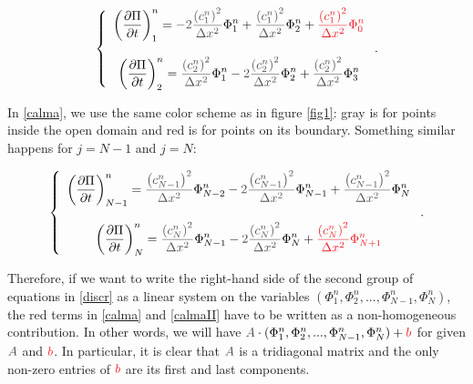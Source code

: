 \documentclass{article}
\begin{document}
\begin{equation}\label{calma}
\left\{\begin{array}{c}
\displaystyle\left(\frac{\partial \Pi}{\partial t}\right)^n_1=\textcolor{grayII}{-2\frac{\left(c^n_1\right)^2}{\Delta x^2}}\Phi^n_1+\textcolor{grayII}{\frac{\left(c^n_1\right)^2}{\Delta x^2}}\Phi^n_2+\textcolor{Red}{\frac{\left(c^n_1\right)^2}{\Delta x^2}\Phi^n_{0}}\\
\text{ }\\
\displaystyle\left(\frac{\partial \Pi}{\partial t}\right)^n_2=\textcolor{grayII}{\frac{\left(c^n_2\right)^2}{\Delta x^2}}\Phi^n_1-\textcolor{grayII}{2\frac{\left(c^n_2\right)^2}{\Delta x^2}}\Phi^n_2+\textcolor{grayII}{\frac{\left(c^n_2\right)^2}{\Delta x^2}}\Phi^n_3
\end{array}\right..
\end{equation}

In \eqref{calma}, we use the same color scheme as in figure \ref{fig1}: gray is for points inside the open domain and red is for points on its boundary. Something similar happens for $j=N-1$ and $j=N$:

\begin{equation}\label{calmaII}
\left\{\begin{array}{c}
\displaystyle\left(\frac{\partial \Pi}{\partial t}\right)^n_{N-1}=\textcolor{grayII}{\frac{\left(c^n_{N-1}\right)^2}{\Delta x^2}}\Phi^n_{N-2}-\textcolor{grayII}{2\frac{\left(c^n_{N-1}\right)^2}{\Delta x^2}}\Phi^n_{N-1}+\textcolor{grayII}{\frac{\left(c^n_{N-1}\right)^2}{\Delta x^2}}\Phi^n_N\\
\text{ }\\
\displaystyle\left(\frac{\partial \Pi}{\partial t}\right)^n_N=\textcolor{grayII}{\frac{\left(c^n_N\right)^2}{\Delta x^2}}\Phi^n_{N-1}-\textcolor{grayII}{2\frac{\left(c^n_N\right)^2}{\Delta x^2}}\Phi^n_N+\textcolor{Red}{\frac{\left(c^n_N\right)^2}{\Delta x^2}\Phi^n_{N+1}}
\end{array}\right..
\end{equation}

Therefore, if we want to write the right-hand side of the second group of equations in \eqref{discr} as a linear system on the variables $(\Phi^n_1,\Phi^n_2,...,\Phi^n_{N-1},\Phi^n_N)$, the red terms in \eqref{calma} and \eqref{calmaII} have to be written as a non-homogeneous contribution. In other words, we will have $\textcolor{grayII}{A}\cdot(\Phi^n_1,\Phi^n_2,...,\Phi^n_{N-1},\Phi^n_N)+\textcolor{Red}{b}$ for given $\textcolor{grayII}{A}$ and $\textcolor{Red}{b}$. In particular, it is clear that $\textcolor{grayII}{A}$ is a tridiagonal matrix and the only non-zero entries of $\textcolor{Red}{b}$ are its first and last components.
\end{document}
